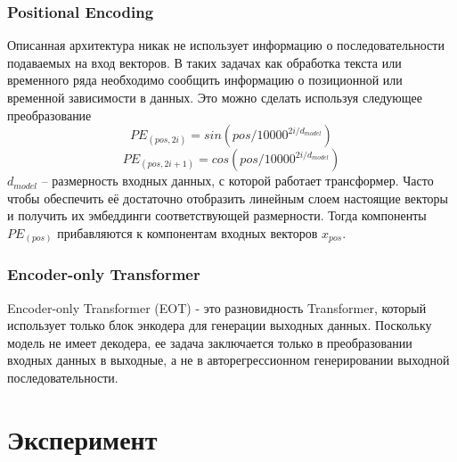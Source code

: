 \documentclass[diploma]{nanolab2015}
\begin{document}
\subsubsection{Positional Encoding}
Описанная архитектура никак не использует информацию о последовательности подаваемых на вход векторов. В таких задачах как обработка текста или временного ряда необходимо сообщить информацию о позиционной или временной зависимости в данных. Это можно сделать используя следующее преобразование
$$PE_{(pos,2i)} = sin(pos/10000^{2i/d_{model}})$$
$$PE_{(pos,2i+1)} = cos(pos/10000^{2i/d_{model}})$$
$d_{model}$ -- размерность входных данных, с которой работает трансформер. Часто чтобы обеспечить её достаточно отобразить линейным слоем настоящие векторы и получить их эмбеддинги соответствующей размерности. Тогда компоненты $PE_{(pos)}$ прибавляются к компонентам входных векторов $x_{pos}$.

\subsubsection{Encoder-only Transformer}
Encoder-only Transformer (EOT) - это разновидность Transformer, который использует только блок энкодера для генерации выходных данных. Поскольку модель не имеет декодера, ее задача заключается только в преобразовании входных данных в выходные, а не в авторегрессионном генерировании выходной последовательности.


\newpage
\section{Эксперимент}
\end{document}
